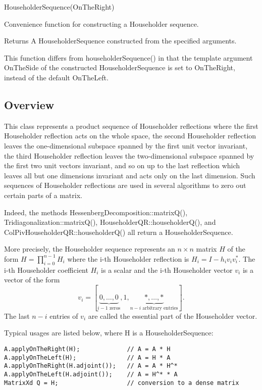 \vspace{0.3cm}
HouseholderSequence(OnTheRight)   

Convenience function for constructing a Householder sequence. 

Returns A HouseholderSequence constructed from the specified arguments.

This function differs from householderSequence() in that the template argument OnTheSide of the constructed HouseholderSequence is set to OnTheRight, instead of the default OnTheLeft. 




\subsection{Overview}

This class represents a product sequence of Householder reflections where the first Householder reflection acts on the whole space, the second Householder reflection leaves the one-dimensional subspace spanned by the first unit vector invariant, the third Householder reflection leaves the two-dimensional subspace spanned by the first two unit vectors invariant, and so on up to the last reflection which leaves all but one dimensions invariant and acts only on the last dimension. Such sequences of Householder reflections are used in several algorithms to zero out certain parts of a matrix. 


\vspace{0.3cm}
Indeed, the methods HessenbergDecomposition::matrixQ(), Tridiagonalization::matrixQ(), HouseholderQR::householderQ(), and ColPivHouseholderQR::householderQ() all return a HouseholderSequence.


\vspace{0.3cm}
More precisely, the Householder sequence represents an $n \times n$ matrix $H$ of the form $H = \prod_{i=0}^{n-1} H_i$ where the i-th Householder reflection is $H_i = I - h_i v_i v_i^*$. The i-th Householder coefficient $H_i$ is a scalar and the i-th Householder vector $v_i$ is a vector of the form 
\begin{equation}
v_i = [\underbrace{0,\ldots,0}_{i-1 \text{ zeros}}, 1, \underbrace{*,\ldots,*}_{n-i \text{ arbitrary entries}}].
\end{equation}
The last $n-i$ entries of $v_i$ are called the essential part of the Householder vector.

Typical usages are listed below, where H is a HouseholderSequence: 


\begin{lstlisting}
A.applyOnTheRight(H);             // A = A * H
A.applyOnTheLeft(H);              // A = H * A
A.applyOnTheRight(H.adjoint());   // A = A * H^*
A.applyOnTheLeft(H.adjoint());    // A = H^* * A
MatrixXd Q = H;                   // conversion to a dense matrix
\end{lstlisting}


